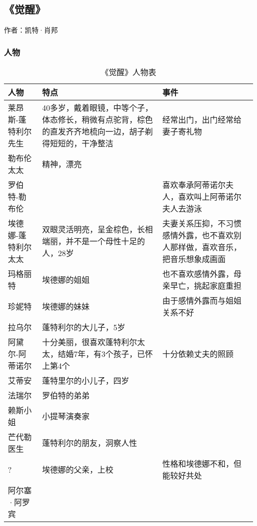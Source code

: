 \subsection{《觉醒》}

作者：凯特·肖邦

\subsubsection{人物}

\begin{longtable}{p{}|p{}|p{}}
    \caption{《觉醒》人物表} \\
    人物 & 特点 & 事件 \\
    \hline
\endhead

\hline
\endfoot
    
莱昂斯-蓬特利尔先生 & 40多岁，戴着眼镜，中等个子，体态修长，稍微有点驼背，棕色的直发齐齐地梳向一边，胡子剃得短短的，干净整洁 & 经常出门，出门经常给妻子寄礼物 \\
勒布伦太太 & 精神，漂亮	& \\
罗伯特-勒布伦 & & 喜欢奉承阿蒂诺尔夫人，喜欢叫上阿蒂诺尔夫人去游泳\\
埃德娜-蓬特利尔太太 & 双眼灵活明亮，呈金棕色，长相端丽，并不是一个母性十足的人，28岁 & 夫妻关系压抑，不习惯感情外露，也不喜欢别人那样做，喜欢音乐，把音乐想象成画面 \\
玛格丽特 & 埃德娜的姐姐 & 也不喜欢感情外露，母亲早亡，挑起家庭重担 \\
珍妮特 & 埃德娜的妹妹 & 由于感情外露而与姐姐关系不好 \\
拉乌尔 & 蓬特利尔的大儿子，5岁	& \\
阿黛尔-阿蒂诺尔 & 十分美丽，很喜欢蓬特利尔太太，结婚7年，有3个孩子，已怀上第4个 & 十分依赖丈夫的照顾 \\
艾蒂安 & 蓬特里尔的小儿子，四岁	& \\
法瑞尔 & 罗伯特的弟弟 & \\
赖斯小姐 & 小提琴演奏家	 & \\
芒代勒医生 & 蓬特利尔的朋友，洞察人性 & \\
? & 埃德娜的父亲，上校 & 性格和埃德娜不和，但能较好共处 \\
阿尔塞·阿罗宾 & & \\
\hline
\end{longtable}	

